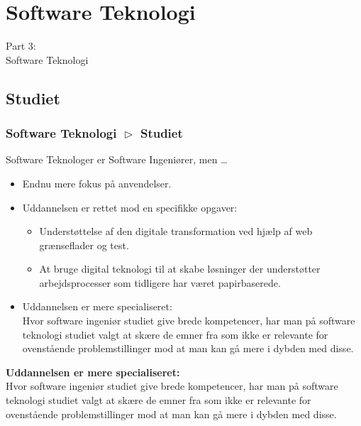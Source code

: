 \section{Software Teknologi}
\begin{frame}
    \vspace{25mm}
    \begin{center}
        \Huge{Part 3:\\Software Teknologi}
    \end{center}
\end{frame}

\subsection{Studiet}
\begin{frame}[fragile]
  \frametitle{Software Teknologi $\vartriangleright$ Studiet}
  \vspace{1mm}
  Software Teknologer er Software Ingeniører, men \ldots
  \begin{itemize}
    \item Endnu mere fokus på anvendelser.
    \item Uddannelsen er rettet mod en specifikke opgaver:
      \begin{itemize}
        \item Understøttelse af den digitale transformation ved hjælp af web grænseflader og test.
        \item At bruge digital teknologi til at skabe løsninger der understøtter arbejdsprocesser som tidligere har været papirbaserede.
      \end{itemize}
    \pause
    \item Uddannelsen er mere specialiseret: \\
      Hvor software ingeniør studiet give brede kompetencer, har man på software teknologi studiet valgt at skære de emner fra som ikke er relevante for ovenstående problemstillinger mod at man kan gå mere i dybden med disse.
  \end{itemize}
  
  \pause
  \vspace{3mm}
  \textbf{Uddannelsen er mere specialiseret:} \\
  Hvor software ingeniør studiet give brede kompetencer, har man på software teknologi studiet valgt at skære de emner fra som ikke er relevante for ovenstående problemstillinger mod at man kan gå mere i dybden med disse.
\end{frame}

